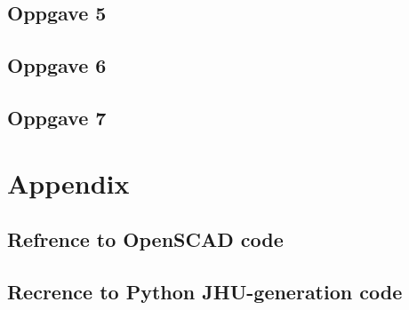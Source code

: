 \documentclass{report}
\begin{document}
\section*{Oppgave 5}

\section*{Oppgave 6}

\section*{Oppgave 7}

\chapter{Appendix}

\section{Refrence to OpenSCAD code}



\section{Recrence to Python JHU-generation code}



\listoffigures
\end{document}
